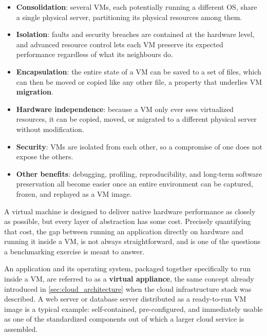 \begin{itemize}
    \item \textbf{Consolidation}: several VMs, each potentially running a different OS, share a single physical server, partitioning its physical resources among them.
    \item \textbf{Isolation}: faults and security breaches are contained at the hardware level, and advanced resource control lets each VM preserve its expected performance regardless of what its neighbours do.
    \item \textbf{Encapsulation}: the entire state of a VM can be saved to a set of files, which can then be moved or copied like any other file, a property that underlies VM \textbf{migration}.
    \item \textbf{Hardware independence}: because a VM only ever sees virtualized resources, it can be copied, moved, or migrated to a different physical server without modification.
    \item \textbf{Security}: VMs are isolated from each other, so a compromise of one does not expose the others.
    \item \textbf{Other benefits}: debugging, profiling, reproducibility, and long-term software preservation all become easier once an entire environment can be captured, frozen, and replayed as a VM image.
\end{itemize}

\begin{tipsblock}
    A virtual machine is designed to deliver native hardware performance as closely as possible, but every layer of abstraction has some cost. Precisely quantifying that cost, the gap between running an application directly on hardware and running it inside a VM, is not always straightforward, and is one of the questions a benchmarking exercise is meant to answer.
\end{tipsblock}

An application and its operating system, packaged together specifically to run inside a VM, are referred to as a \textbf{virtual appliance}, the same concept already introduced in \cref{sec:cloud_architecture} when the cloud infrastructure stack was described. A web server or database server distributed as a ready-to-run VM image is a typical example: self-contained, pre-configured, and immediately usable as one of the standardized components out of which a larger cloud service is assembled.

\vspace{-0.5em}

